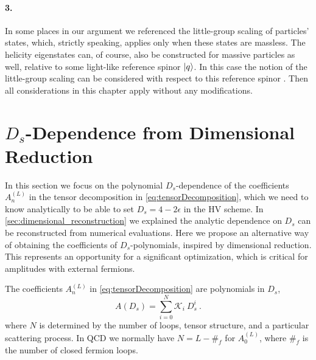 \paragraph{3.}
In some places in our argument we referenced the little-group scaling 
of particles' states, which, strictly speaking, applies only when these states
are massless.
The helicity eigenstates can, of course, also be constructed for
massive particles as well, relative to some light-like reference spinor $\ket{q}$.
In this case the notion of the little-group scaling can be considered with respect
to this reference spinor \cite{Cohen:2010mi}.
Then all considerations in this chapter apply without any modifications.

 

\section{$D_s$-Dependence from Dimensional Reduction}
\label{sec:ds_reduction}

In this section we focus on the polynomial $D_s$-dependence of 
the coefficients $A^{(L)}_n$ in the tensor decomposition in \cref{eq:tensorDecomposition},
which we need to know analytically to be able to set $D_s=4-2\epsilon$ in the HV scheme.
In \cref{sec:dimensional_reconstruction} we explained the analytic dependence on $D_s$ 
can be reconstructed from numerical evaluations.
Here we propose an alternative way of obtaining the coefficients of $D_s$-polynomials, 
inspired by dimensional reduction.
This represents an opportunity for a significant optimization, 
which is critical for amplitudes with external fermions.

The coefficients $A^{(L)}_n$ in \cref{eq:tensorDecomposition} are polynomials in $D_s$,
\begin{equation}
  A(D_s) = \sum_{i=0}^{N} \mathcal{K}_i~D_s^{i}\ .
  \label{eq:ds-poly}
\end{equation}
where $N$ is determined by the number of loops, tensor structure,
and a particular scattering process. 
In QCD we normally have $N=L - \#_f$ for $A^{(L)}_0$, 
where $\#_f$ is the number of closed fermion loops.

